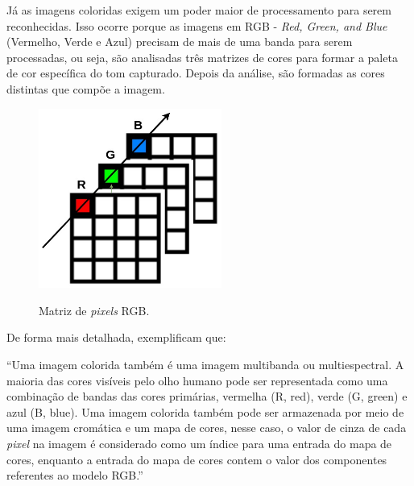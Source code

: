 Já as imagens coloridas exigem um poder maior de processamento para serem reconhecidas. Isso ocorre porque as imagens em RGB - \textit{Red, Green, and Blue} (Vermelho, Verde e Azul)  precisam de mais de uma banda para serem processadas, ou seja, são analisadas três matrizes de cores para formar a paleta de cor específica do tom capturado. Depois da análise, são formadas as cores distintas que compõe a imagem.


\begin{figure}[H]
\caption{ {\footnotesize Matriz de \textit{pixels} RGB.}}
 
\centering %
\includegraphics[width=6cm]{revisao-bibliografica/Figuras/RGB-VC.jpg}%
\label{figura:figura4}

\centering {}
{
\label{figura:figura4}
}
\end{figure}
\FloatBarrier

De forma mais detalhada,  exemplificam que: 
\begin{quoting}[rightmargin=0cm,leftmargin=4cm]
\begin{singlespace}
{\footnotesize  
“Uma imagem colorida também é uma imagem multibanda ou multiespectral. A maioria das cores visíveis pelo olho humano pode ser representada como uma combinação de bandas das cores primárias, vermelha (R, red), verde (G, green) e azul (B, blue). Uma imagem colorida também pode ser armazenada por meio de uma imagem cromática e um mapa de cores, nesse caso, o valor de cinza de cada \textit{pixel} na imagem é considerado como um índice para uma entrada do mapa de cores, enquanto a entrada do mapa de cores contem o valor dos componentes referentes ao modelo RGB.”
}
\end{singlespace}
\end{quoting}


